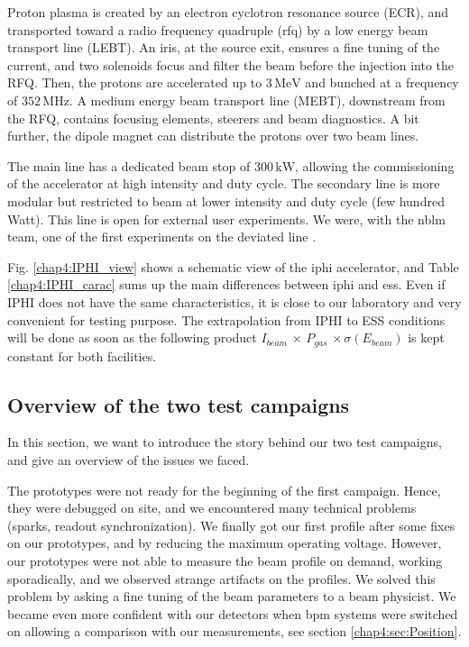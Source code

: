 \begin{refsection}
  
  Proton plasma is created by an electron cyclotron resonance source (ECR), and transported toward a radio frequency quadruple (\acrshort{rfq}) by a low energy beam transport line (LEBT).
  An iris, at the source exit, ensures a fine tuning of the current, and two solenoids focus and filter the beam before the injection into the RFQ.
  Then, the protons are accelerated up to $3\,\mathrm{MeV}$ and bunched at a frequency of $352\,\mathrm{MHz}$.
  A medium energy beam transport line (MEBT), downstream from the RFQ, contains focusing elements, steerers and beam diagnostics.
  A bit further, the dipole magnet can distribute the protons over two beam lines.

  The main line has a dedicated beam stop of $300\,\mathrm{kW}$, allowing the commissioning of the accelerator at high intensity and duty cycle.
  The secondary line is more modular but restricted to beam at lower intensity and duty cycle (few hundred Watt).
  This line is open for external user experiments.
  We were, with the \acrshort{nblm} team, one of the first experiments on the deviated line \cite{Senee:IPAC2018-TUPAF016}.

  Fig. \ref{chap4:IPHI_view} shows a schematic view of the \acrshort{iphi} accelerator, and Table \ref{chap4:IPHI_carac} sums up the main differences between \acrshort{iphi} and \acrshort{ess}. Even if IPHI does not have the same characteristics, it is close to our laboratory and very convenient for testing purpose. The extrapolation from IPHI to ESS conditions will be done as soon as the following product $I_{beam}\,\times\,P_{gas}\,\times\sigma(E_{beam})$ is kept constant for both facilities.

  

  \subsection{Overview of the two test campaigns}
  In this section, we want to introduce the story behind our two test campaigns, and give an overview of the issues we faced.

  

  The prototypes were not ready for the beginning of the first campaign.
  Hence, they were debugged on site, and we encountered many technical problems (sparks, readout synchronization).
  We finally got our first profile after some fixes on our prototypes, and by reducing the maximum operating voltage.
  However, our prototypes were not able to measure the beam profile on demand, working sporadically, and we observed strange artifacts on the profiles.
  We solved this problem by asking a fine tuning of the beam parameters to a beam physicist.
  We became even more confident with our detectors when \acrfull{bpm} systems were switched on allowing a comparison with our measurements, see section \ref{chap4:sec:Position}.



\end{refsection}
